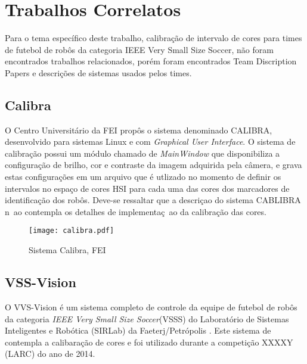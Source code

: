 \section{Trabalhos Correlatos}
Para o tema específico deste trabalho, calibração de intervalo de cores para times de futebol de robôs da categoria IEEE Very Small Size Soccer, não foram encontrados trabalhos relacionados, porém foram encontrados Team Discription Papers e descrições de sistemas usados pelos times\cite{Penharbel:2004}\cite{Rosa:2015}\cite{VSSVision}\cite{PenharbelTime}.

\subsection{Calibra}
O Centro Universitário da FEI propôs o sistema denominado CALIBRA, desenvolvido para sistemas Linux e com {\it Graphical User Interface}. O sistema de calibração possui um módulo chamado de {\it MainWindow} que disponibiliza a configuração de brilho, cor e contraste da imagem adquirida pela câmera, e grava estas configurações em um arquivo que é utlizado no momento de definir os intervalos no espaço de cores HSI para cada uma das cores dos marcadores de identificação dos robôs\cite{Penharbel:2004,PenharbelTime}. Deve-se ressaltar que a descriçao do sistema CABLIBRA n~ao contempla os detalhes de implementaç~ao da calibração das cores.
\begin{figure}[H]
	\centering
	\texttt{[image: calibra.pdf]}
	\caption{Sistema Calibra, FEI\cite{Penharbel:2004}}
	\label{Calibra}
\end{figure}

\subsection{VSS-Vision}

O VVS-Vision é um sistema completo de controle da equipe de futebol de robôs da categoria {\it IEEE Very Small Size Soccer}(VSSS) do Laboratório de Sistemas Inteligentes e Robótica (SIRLab) da Faeterj/Petrópolis \cite{Rosa:2015}. Este sistema de contempla a calibaração de cores e foi utilizado durante a competição XXXXY (LARC) do ano de 2014.

